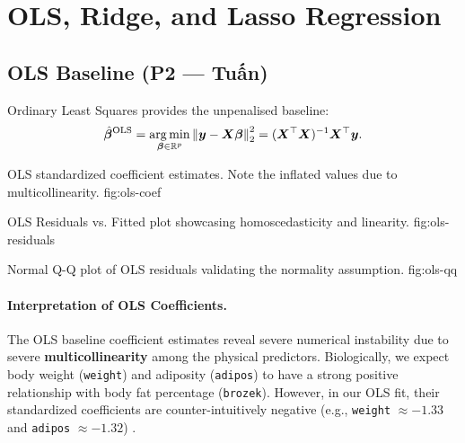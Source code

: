 \section{OLS, Ridge, and Lasso Regression}
\label{sec:ols-ridge-lasso}

\subsection{OLS Baseline (P2 — Tuấn)}
\label{sec:ols}

Ordinary Least Squares provides the unpenalised baseline:
\[
    \hat{\bm{\beta}}^{\mathrm{OLS}}
    = \operatorname*{arg\,min}_{\bm{\beta} \in \mathbb{R}^p} \left\lVert \bm{y} - \bm{X} \bm{\beta} \right\rVert_2^2
    = (\bm{X}^\top \bm{X})^{-1} \bm{X}^\top \bm{y}.
\]

\begin{table}[H]
\centering
\caption{OLS coefficient estimates on the training set.}
\label{tab:ols-coef}

\end{table}

%
    {OLS standardized coefficient estimates. Note the inflated values due to multicollinearity.}%
    {fig:ols-coef}

%
    {OLS Residuals vs. Fitted plot showcasing homoscedasticity and linearity.}%
    {fig:ols-residuals}

%
    {Normal Q-Q plot of OLS residuals validating the normality assumption.}%
    {fig:ols-qq}

\paragraph{Interpretation of OLS Coefficients.}
The OLS baseline coefficient estimates reveal severe numerical instability due to severe \textbf{multicollinearity} among the physical predictors. 
Biologically, we expect body weight (\texttt{weight}) and adiposity (\texttt{adipos}) to have a strong positive relationship with body fat percentage (\texttt{brozek}). 
However, in our OLS fit, their standardized coefficients are counter-intuitively negative (e.g., \texttt{weight} $\approx -1.33$ and \texttt{adipos} $\approx -1.32$) \cite{123}. 

